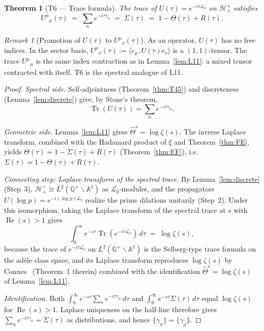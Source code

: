 \documentclass[12pt,a4paper]{article}
\newtheorem{theorem}{Theorem}[section]
\theoremstyle{remark}
\newtheorem*{remark}{Remark}
\begin{document}
\begin{theorem}[T6 --- Trace formula]\label{thm:T6}
The trace of $U(\tau)=e^{-i\tau\mathcal{L}_0}$ on $\mathcal{H}^+_+$ satisfies
\[
U^{\mu}{}_\mu(\tau)
\;=\; \sum_n e^{-i\tau\gamma_n}
\;=\; \Sigma(\tau)
\;=\; 1 - \Theta(\tau) + R(\tau).
\]
\end{theorem}

\begin{remark}[Promotion of $U(\tau)$ to $U^{\mu}{}_\nu(\tau)$]
As an operator, $U(\tau)$ has no free indices.
In the sector basis, $U^{\mu}{}_\nu(\tau):=\langle e_\mu,U(\tau)e_\nu\rangle$
is a $(1,1)$-tensor.
The trace $U^{\mu}{}_\mu$ is the same index contraction as in
Lemma~\ref{lem:L11}: a mixed tensor contracted with itself.
T6 is the spectral analogue of L11.
\end{remark}

\begin{proof}
\emph{Spectral side.}
Self-adjointness (Theorem~\ref{thm:T45}) and discreteness
(Lemma~\ref{lem:discrete}) give, by Stone's theorem,
\[
  \operatorname{Tr}(U(\tau)) = \sum_n e^{-i\tau\gamma_n}.
\]

\emph{Geometric side.}
Lemma~\ref{lem:L11} gives $\hat\Theta^s=\log\zeta(s)$.
The inverse Laplace transform, combined with the Hadamard product
of $\xi$ and Theorem~\ref{thm:FE}, yields
$\Theta(\tau)=1-\Sigma(\tau)+R(\tau)$ (Theorem~\ref{thm:EF}),
i.e.\ $\Sigma(\tau)=1-\Theta(\tau)+R(\tau)$.

\emph{Connecting step: Laplace transform of the spectral trace.}
By Lemma~\ref{lem:discrete} (Step~3), $\mathcal{H}^+_+\cong
L^2(\mathbb{Q}^+\backslash\mathbb{A}^1)$ as $\mathcal{L}_0$-modules,
and the propagators $U(\log p)=e^{-i(\log p)\mathcal{L}_0}$ realize the
prime dilations unitarily (Step~2).
Under this isomorphism, taking the Laplace transform of the spectral
trace at $s$ with $\operatorname{Re}(s)>1$ gives
\[
  \int_0^\infty e^{-s\tau}\operatorname{Tr}(e^{-i\tau\mathcal{L}_0})\,d\tau
  \;=\; \log\zeta(s),
\]
because the trace of $e^{-i\tau\mathcal{L}_0}$ on
$L^2(\mathbb{Q}^+\backslash\mathbb{A}^1)$ is the Selberg-type trace
formula on the adèle class space, and its Laplace transform reproduces
$\log\zeta(s)$ by Connes~\cite{Connes1999} (Theorem~1 therein) combined
with the identification $\hat\Theta^s=\log\zeta(s)$ of Lemma~\ref{lem:L11}.

\emph{Identification.}
Both $\int_0^\infty e^{-s\tau}\sum_n e^{-i\tau\gamma_n}\,d\tau$ and
$\int_0^\infty e^{-s\tau}\Sigma(\tau)\,d\tau$ equal $\log\zeta(s)$
for $\operatorname{Re}(s)>1$.
Laplace uniqueness on the half-line therefore gives
$\sum_n e^{-i\tau\gamma_n}=\Sigma(\tau)$ as distributions,
and hence $\{\gamma_n\}=\{\gamma_\rho\}$.
\end{proof}
\end{document}

